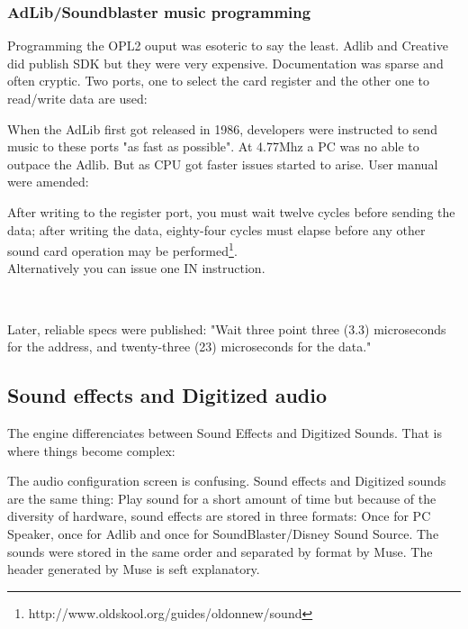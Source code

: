 \subsubsection{AdLib/Soundblaster music programming}
\par
Programming the OPL2 ouput was esoteric to say the least. Adlib and Creative did publish SDK but they were very expensive. Documentation was sparse and often cryptic. Two ports, one to select the card register and the other one to read/write data are used:\\
\par
\begin{minipage}{\textwidth}

\end{minipage}
\par
When the AdLib first got released in 1986, developers were instructed to send music  to these ports "as fast as possible". At 4.77Mhz a PC was no able to outpace the Adlib. But as CPU got faster issues started to arise. User manual were amended: 


\begin{fancyquotes}
After writing to the register port, you must wait twelve cycles before sending the data; after writing the data, eighty-four cycles must elapse before any other sound card operation may be performed\footnote{http://www.oldskool.org/guides/oldonnew/sound}.
 \bigskip \\
 Alternatively you can issue one IN instruction.
 \bigskip \\
 \end{fancyquotes}
\\
\par
Later, reliable specs were published: "Wait three point three (3.3) microseconds for the address, and twenty-three (23) microseconds for the data."\\
\par










\subsection{Sound effects and Digitized audio}
The engine differenciates between Sound Effects and Digitized Sounds. That is where things become complex:
\par
\begin{figure}[H]
\centering
 \end{figure}
\par
The audio configuration screen is confusing. Sound effects and Digitized sounds are the same thing: Play sound for a short amount of time but because of the diversity of hardware, sound effects are stored in three formats: Once for PC Speaker, once for Adlib and once for SoundBlaster/Disney Sound Source. The sounds were stored in the same order and separated by format by Muse. The header generated by Muse is seft explanatory.\\


